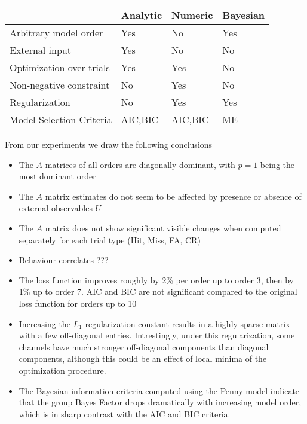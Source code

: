 \documentclass[a4paper,10pt]{article}
\begin{document}
\begin{table}[h!]
\centering
\begin{tabular}{l | l | l | l}
                            & Analytic & Numeric & Bayesian \\ \hline
  Arbitrary model order     & Yes & No & Yes \\ \hline
  External input            & Yes & No & No \\ \hline
  Optimization over trials  & Yes & Yes & No \\ \hline
  Non-negative constraint   & No  & Yes & No \\ \hline
  Regularization            & No  & Yes & Yes \\ \hline
  Model Selection Criteria  & AIC,BIC  & AIC,BIC & ME \\
\end{tabular}
\end{table}

From our experiments we draw the following conclusions
\begin{itemize}
 \item The $A$ matrices of all orders are diagonally-dominant, with $p=1$ being the most dominant order
 \item The $A$ matrix estimates do not seem to be affected by presence or absence of external observables $U$
 \item The $A$ matrix does not show significant visible changes when computed separately for each trial type (Hit, Miss, FA, CR)
 \item Behaviour correlates ???
 \item The loss function improves roughly by 2\% per order up to order 3, then by 1\% up to order 7. AIC and BIC are not significant compared to the original loss function for orders up to 10
 \item Increasing the $L_1$ regularization constant results in a highly sparse matrix with a few off-diagonal entries. Intrestingly, under this regularization, some channels have much stronger off-diagonal components than diagonal components, although this could be an effect of local minima of the optimization procedure.
 \item The Bayesian information criteria computed using the Penny\cite{penny_bayesian_2002} model indicate that the group Bayes Factor drops dramatically with increasing model order, which is in sharp contrast with the AIC and BIC criteria. 

\end{itemize}
\end{document}
